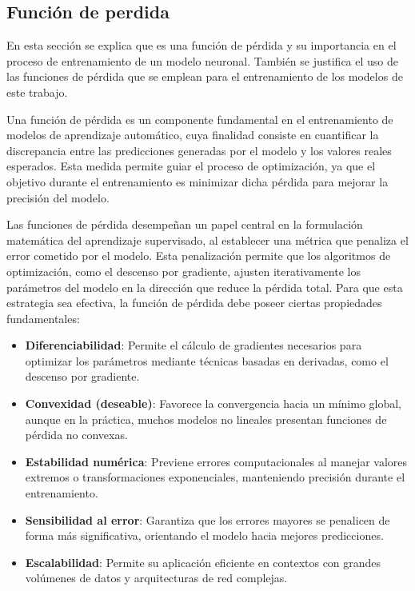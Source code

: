 \subsection{Función de perdida}
En esta sección se explica que es una función de pérdida y su importancia en el proceso de entrenamiento de un modelo neuronal. También se justifica el uso de las funciones de pérdida que se emplean para el entrenamiento de los modelos de este trabajo.

Una función de pérdida es un componente fundamental en el entrenamiento de modelos de aprendizaje automático, cuya finalidad consiste en cuantificar la discrepancia entre las predicciones generadas por el modelo y los valores reales esperados. Esta medida permite guiar el proceso de optimización, ya que el objetivo durante el entrenamiento es minimizar dicha pérdida para mejorar la precisión del modelo.\cite{eitca_loss_function}

Las funciones de pérdida desempeñan un papel central en la formulación matemática del aprendizaje supervisado, al establecer una métrica que penaliza el error cometido por el modelo. Esta penalización permite que los algoritmos de optimización, como el descenso por gradiente, ajusten iterativamente los parámetros del modelo en la dirección que reduce la pérdida total. Para que esta estrategia sea efectiva, la función de pérdida debe poseer ciertas propiedades fundamentales:

\begin{itemize}

    \item\textbf{Diferenciabilidad}: Permite el cálculo de gradientes necesarios para optimizar los parámetros mediante técnicas basadas en derivadas, como el descenso por gradiente.

    \item\textbf{Convexidad (deseable)}: Favorece la convergencia hacia un mínimo global, aunque en la práctica, muchos modelos no lineales presentan funciones de pérdida no convexas.

    \item\textbf{Estabilidad numérica}: Previene errores computacionales al manejar valores extremos o transformaciones exponenciales, manteniendo precisión durante el entrenamiento.

 	\item\textbf{Sensibilidad al error}: Garantiza que los errores mayores se penalicen de forma más significativa, orientando el modelo hacia mejores predicciones.

	\item\textbf{Escalabilidad}: Permite su aplicación eficiente en contextos con grandes volúmenes de datos y arquitecturas de red complejas.

\end{itemize}

